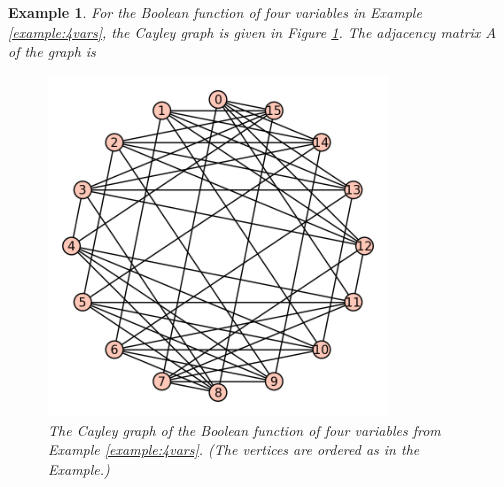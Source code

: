 \documentclass[12pt]{article}
\newtheorem{example}[theorem]{Example}
\begin{document}
\begin{example}
\label{example:4vars-graph}
For the Boolean function of four variables in
Example \ref{example:4vars}, the Cayley graph
is given in Figure \ref{fig:monotone-boolean-fcns-4vars-graph}.
The adjacency matrix $A$ of the graph is


\begin{figure}[t!]
\begin{minipage}{\textwidth}
\begin{center}
\includegraphics[height=9cm,width=9cm]{monotone-boolean-fcns-4vars-graph}
\end{center}
\end{minipage}
\caption{The Cayley graph of the Boolean function of four
  variables from Example \ref{example:4vars}. (The vertices are
  ordered as in the Example.)}
\label{fig:monotone-boolean-fcns-4vars-graph}
\end{figure}


\end{example}
\end{document}

